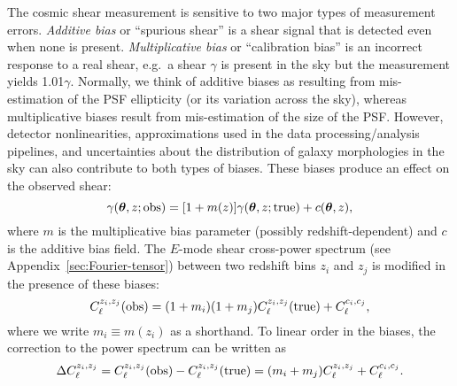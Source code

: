 The cosmic shear measurement is sensitive to two major types of measurement errors. {\em Additive bias} or ``spurious shear'' is a shear signal that is detected even when none is present. {\em Multiplicative bias} or ``calibration bias'' is an incorrect response to a real shear, e.g.\ a shear $\gamma$ is present in the sky but the measurement yields 1.01$\gamma$. Normally, we think of additive biases as resulting from mis-estimation of the PSF ellipticity (or its variation across the sky), whereas multiplicative biases result from mis-estimation of the size of the PSF. However, detector nonlinearities, approximations used in the data processing/analysis pipelines, and uncertainties about the distribution of galaxy morphologies in the sky can also contribute to both types of biases. These biases produce an effect on the observed shear:
\begin{equation}
\gamma({\boldsymbol\theta},z;{\rm obs}) = [1+m(z)] \gamma({\boldsymbol\theta},z;{\rm true}) + c({\boldsymbol\theta},z),
\label{eq:gmod}
\end{equation}
where $m$ is the multiplicative bias parameter (possibly redshift-dependent) and $c$ is the additive bias field. The $E$-mode shear cross-power spectrum (see Appendix~\ref{sec:Fourier-tensor}) between two redshift bins $z_i$ and $z_j$ is modified in the presence of these biases:
\begin{equation}
C_\ell^{z_i,z_j}({\rm obs}) = (1+m_i)(1+m_j)C_\ell^{z_i,z_j}({\rm true}) + C_\ell^{c_i,c_j},
\label{eq:mod}
\end{equation}
where we write $m_i\equiv m(z_i)$ as a shorthand. To linear order in the biases, the correction to the power spectrum can be written as
\begin{equation}
\Delta C_\ell^{z_i,z_j} = C_\ell^{z_i,z_j}({\rm obs}) - C_\ell^{z_i,z_j}({\rm true}) = (m_i+m_j)C_\ell^{z_i,z_j}+C_\ell^{c_i,c_j}.
\label{eq:Delta C}
\end{equation}

